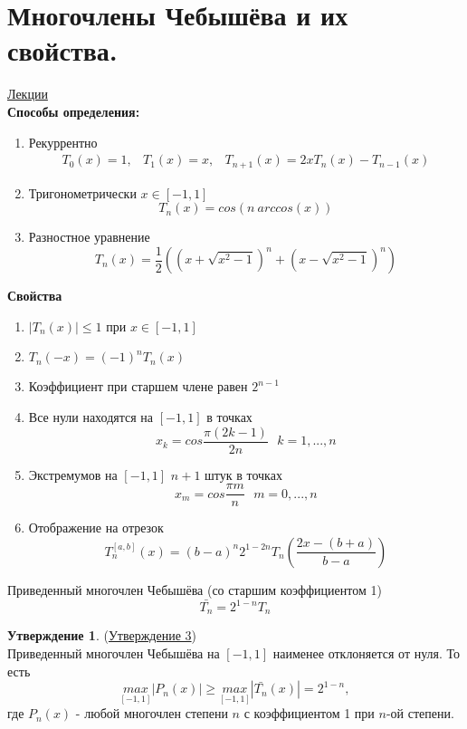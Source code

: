 \documentclass[specialist, subf, href, colorlinks=true, 12pt, times, mtpro, final]{disser}
\theoremstyle{definition}
\newtheorem{state}{Утверждение}[section]
\begin{document}
\section {Многочлены Чебышёва и их свойства.}
    \hyperlink {lects.18}{Лекции}\\
    \textbf{Способы определения:}
    \begin{enumerate}
        \item Рекуррентно 
              $$
                \begin{array}{lcr}
                    T_0(x) = 1, & T_1(x) = x, & T_{n+1}(x) = 2xT_n(x) - T_{n-1}(x)
                \end{array}
              $$
        \item Тригонометрически $x\in[-1,1]$
              $$
                T_n(x) = cos(n \ arccos(x))
              $$
        \item Разностное уравнение
              $$
                T_n(x) = \frac{1}{2}\left( \left( x + \sqrt{x^2 - 1} \right)^n + \left( x - \sqrt{x^2 - 1} \right)^n \right)
              $$
    \end{enumerate}
    \textbf{Свойства}
    \begin{enumerate}
        \item $|T_n(x)| \le 1$ при $x \in [-1,1]$
        \item $T_n(-x) = (-1)^nT_n(x)$
        \item Коэффициент при старшем члене равен $2^{n - 1}$
        \item Все нули находятся на $[-1,1]$ в точках
            $$
                x_k = cos \frac{\pi (2k -1)}{2n} \ \ \ k = 1, ... , n
            $$
        \item Экстремумов на $[-1,1]$ $n+1$ штук в точках
            $$
                x_m = cos \frac{\pi m}{n} \ \ \ m = 0, ... , n
            $$ 
        \item Отображение на отрезок 
            $$
                T_n^{[a,b]} (x) = (b - a)^n 2^{1-2n} T_n \left( \frac{2x - (b+a)}{b-a} \right)
            $$
    \end{enumerate}

    Приведенный многочлен Чебышёва (со старшим коэффициентом 1)
    $$
        \bar {T_n} = 2^{1 - n}T_n
    $$
    
    \begin{state} (\hyperlink {lects.19}{Утверждение 3})\\
        Приведенный многочлен Чебышёва на $[-1,1]$ наименее отклоняется от нуля. То есть 
        $$
            \underset{[-1,1]}{max}|P_n(x)| \ge \underset{[-1,1]}{max} |\bar{T_n}(x)| = 2^{1-n},
        $$
        где $P_n(x)$ - любой многочлен степени $n$ с коэффициентом 1 при $n$-ой степени.
    \end{state}
\end{document}
